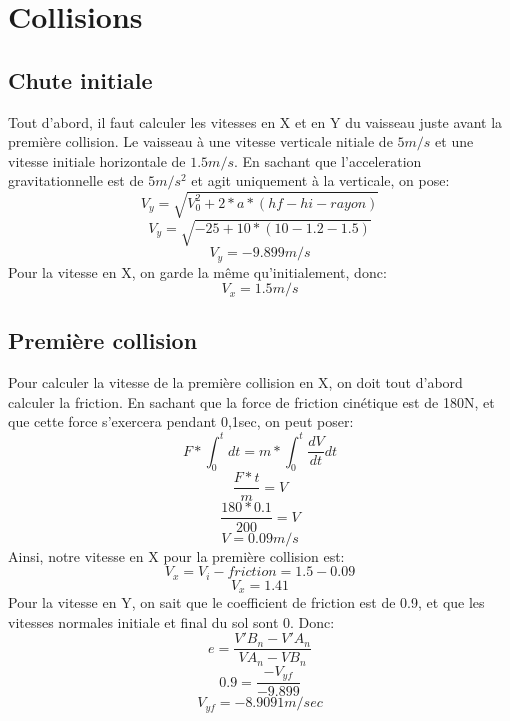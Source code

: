 \documentclass{article}
\begin{document}
\section{Collisions}
\subsection{Chute initiale}
Tout d'abord, il faut calculer les vitesses en X et en Y du vaisseau juste avant la première collision. Le vaisseau à une vitesse verticale nitiale de $5m/s$ et une vitesse initiale horizontale de $1.5m/s$. En sachant que l'acceleration gravitationnelle est de $5m/s^2$ et agit uniquement à la verticale, on pose:
\begin{equation}
V_y = \sqrt{V_0^2 + 2*a*(hf-hi-rayon)}
\end{equation}
\begin{equation}
V_y = \sqrt{-25 + 10*(10-1.2-1.5)}
\end{equation}
\begin{equation}
V_y = -9.899 m/s
\end{equation}
Pour la vitesse en X, on garde la même qu'initialement, donc:
\begin{equation}
V_x = 1.5 m/s
\end{equation}
\subsection{Première collision}
Pour calculer la vitesse de la première collision en X, on doit tout d'abord calculer la friction. En sachant que la force de friction cinétique est de 180N, et que cette force s'exercera pendant 0,1sec, on peut poser:
\begin{equation}
F*\int_{0}^{t} dt = m*\int_{0}^{t} \frac{dV}{dt}dt 
\end{equation}
\begin{equation}
\frac{F*t}{m} = V
\end{equation}
\begin{equation}
\frac{180*0.1}{200} = V
\end{equation}
\begin{equation}
V = 0.09m/s
\end{equation}
Ainsi, notre vitesse en X pour la première collision est:
\begin{equation}
V_x = V_i - friction = 1.5-0.09
\end{equation}
\begin{equation}
V_x = 1.41
\end{equation}
Pour la vitesse en Y, on sait que le coefficient de friction est de 0.9, et que les vitesses normales initiale et final du sol sont 0. Donc:
\begin{equation}
e = \frac{V'B_n-V'A_n}{VA_n-VB_n}
\end{equation}
\begin{equation}
0.9 = \frac{-V_{yf}}{-9.899}
\end{equation}
\begin{equation}
V_{yf} = -8.9091 m/sec
\end{equation}
\end{document}
